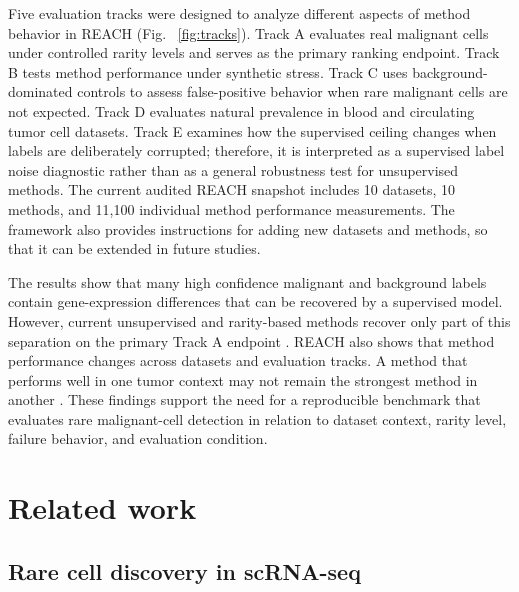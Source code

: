 \documentclass[10pt]{article}
\begin{document}
Five evaluation tracks were designed to analyze different aspects of method behavior in REACH (Fig. ~\ref{fig:tracks}). Track A evaluates real malignant cells under controlled rarity levels and serves as the primary ranking endpoint. Track B tests method performance under synthetic stress. Track C uses background-dominated controls to assess false-positive behavior when rare malignant cells are not expected. Track D evaluates natural prevalence in blood and circulating tumor cell datasets. Track E examines how the supervised ceiling changes when labels are deliberately corrupted; therefore, it is interpreted as a supervised label noise diagnostic rather than as a general robustness test for unsupervised methods. The current audited REACH snapshot includes 10 datasets, 10 methods, and 11,100 individual method performance measurements. The framework also provides instructions for adding new datasets and methods, so that it can be extended in future studies.

The results show that many high confidence malignant and background labels contain gene-expression differences that can be recovered by a supervised model. However, current unsupervised and rarity-based methods recover only part of this separation on the primary Track A endpoint \cite{abdelaal2019comparison,mahalanabis2022evaluation}. REACH also shows that method performance changes across datasets and evaluation tracks. A method that performs well in one tumor context may not remain the strongest method in another \cite{xu2024sccad,ye2025revealing}. These findings support the need for a reproducible benchmark that evaluates rare malignant-cell detection in relation to dataset context, rarity level, failure behavior, and evaluation condition.

\section{Related work}

\subsection{Rare cell discovery in scRNA-seq}
\end{document}
